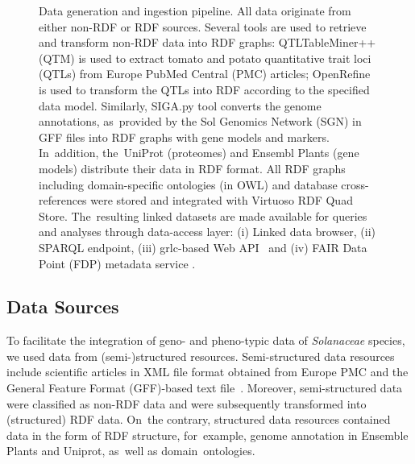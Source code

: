 \documentclass[applsci,article,accept,moreauthors,pdftex]{Definitions/mdpi}
\begin{document}
{\begin{figure}[H]
\caption{Data generation and ingestion pipeline. All data originate from either non-RDF or RDF sources.
Several tools are used to retrieve and transform non-RDF data into RDF graphs: QTLTableMiner++ (QTM) \cite{singh2018qtltableminer++} %
is used to extract tomato and potato quantitative trait loci (QTLs) from Europe PubMed Central (PMC) %
articles; OpenRefine \cite{OpenRefine} %
is used to transform the QTLs into RDF according to the specified data model. Similarly, SIGA.py tool \cite{SIGA} %
converts the genome annotations, as~provided by the Sol Genomics Network (SGN) in GFF files into RDF graphs with gene models and markers. In~addition, the~UniProt (proteomes) and Ensembl Plants (gene models) distribute their data in RDF format. All RDF graphs including domain-specific ontologies (in OWL) and database cross-references were stored and integrated with Virtuoso RDF Quad Store. The~resulting linked datasets are made available for queries and analyses through data-access layer: (i) Linked data browser, (ii) SPARQL endpoint, (iii) grlc-based Web API~\cite{Merono-Penuela2016} and
(iv) FAIR Data Point (FDP) metadata service \cite{DaSilvaSantos2016}.} %
\label{Figure1}
\end{figure}
\unskip


\subsection{Data Sources} 

To facilitate the integration of geno- and pheno-typic data of \textit{Solanaceae} %
species, we used data from (semi-)structured resources. Semi-structured data resources include scientific articles in XML file format
obtained from Europe PMC \cite{europe2015europe} and the General Feature Format (GFF)-based text file~\cite{GFF3}. %
Moreover, semi-structured data were classified as non-RDF data and were subsequently transformed into (structured) RDF data. On~the contrary, structured data resources contained data in the form of RDF structure, for~example, genome annotation in Ensemble Plants and Uniprot, as~well as domain~ontologies.

}
\end{document}
